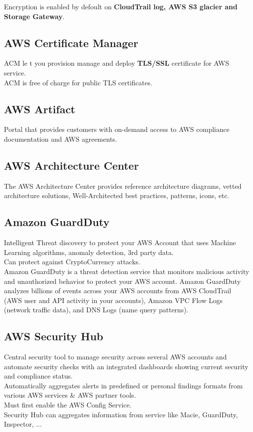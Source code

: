 \documentclass[12pt, letterpaper, twoside]{article}
\begin{document}
Encryption is enabled by defoult on \textbf{CloudTrail log, AWS S3 glacier and Storage Gateway}.\\

\subsection{AWS Certificate Manager}
ACM le t you provision manage and deploy \textbf{TLS/SSL} certificate for AWS service.\\
ACM is free of charge for public TLS certificates.\\

\subsection{AWS Artifact}
Portal that provides customers with on-demand access to AWS compliance documentation and AWS agreements.\\

\subsection{AWS Architecture Center}
The AWS Architecture Center provides reference architecture diagrams, vetted architecture solutions, 
Well-Architected best practices, patterns, icons, etc.\\

\subsection{Amazon GuardDuty}
Intelligent Threat discovery to protect your AWS Account that uses Machine Learning algorithms, anomaly detection, 
3rd party data.\\
Can protect against CryptoCurrency attacks.\\
Amazon GuardDuty is a threat detection service that monitors malicious activity and unauthorized behavior to protect your AWS 
account. Amazon GuardDuty analyzes billions of events across your AWS accounts from AWS CloudTrail (AWS user and API activity 
in your accounts), Amazon VPC Flow Logs (network traffic data), and DNS Logs (name query patterns).\\

\subsection{AWS Security Hub}
Central security tool to manage security across several AWS accounts and automate security checks with an
integrated dashboards showing current security and compliance status.\\
Automatically aggregates alerts in predefined or personal findings formats from various
AWS services \& AWS partner tools.\\
Must first enable the AWS Config Service.\\
Security Hub can aggregates information from service like Macie, GuardDuty, Inspector, ...\\
\end{document}
